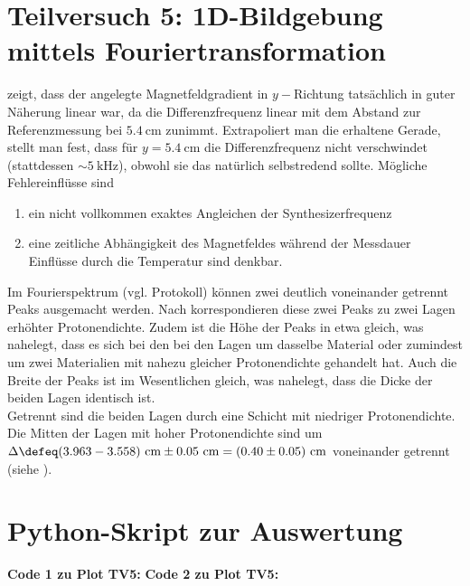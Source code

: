 \documentclass[11pt,a4paper,oneside]{scrartcl}
\begin{document}
\section{Teilversuch 5: 1D-Bildgebung mittels Fouriertransformation}
 zeigt, dass der angelegte Magnetfeldgradient in $y-$Richtung tatsächlich in guter Näherung linear war, da die Differenzfrequenz linear mit dem Abstand zur Referenzmessung bei $5.4\ \mathrm{cm}$ zunimmt. Extrapoliert man die erhaltene Gerade, stellt man fest, dass für $y=5.4\ \mathrm{cm}$ die Differenzfrequenz nicht verschwindet (stattdessen $\sim 5\ \mathrm{kHz}$), obwohl sie das natürlich selbstredend sollte. Mögliche Fehlereinflüsse sind
\begin{enumerate}
\item ein nicht vollkommen exaktes Angleichen der Synthesizerfrequenz 
\item eine zeitliche Abhängigkeit des Magnetfeldes während der Messdauer Einflüsse durch die Temperatur sind denkbar.
\end{enumerate}

Im Fourierspektrum (vgl. Protokoll) können zwei deutlich voneinander getrennt Peaks ausgemacht werden. Nach  korrespondieren diese zwei Peaks zu zwei Lagen erhöhter Protonendichte. Zudem ist die Höhe der Peaks in etwa gleich, was nahelegt, dass es sich bei den bei den Lagen um dasselbe Material oder zumindest um zwei Materialien mit nahezu gleicher Protonendichte gehandelt hat. Auch die Breite der Peaks ist im Wesentlichen gleich, was nahelegt, dass die Dicke der beiden Lagen identisch ist. \\ Getrennt sind die beiden Lagen durch eine Schicht mit niedriger Protonendichte. Die Mitten der Lagen mit hoher Protonendichte sind um  $\Delta\defeq (3.963-3.558)\ \mathrm{cm} \pm 0.05\ \mathrm{cm}=(0.40\pm 0.05)\ \mathrm{cm}$ voneinander getrennt (siehe ). 
\newpage
\appendix
\section{Python-Skript zur Auswertung}
\large\textbf{Code 1 zu Plot TV5:}
\newpage
\large\textbf{Code 2 zu Plot TV5:}
\newpage
\end{document}
